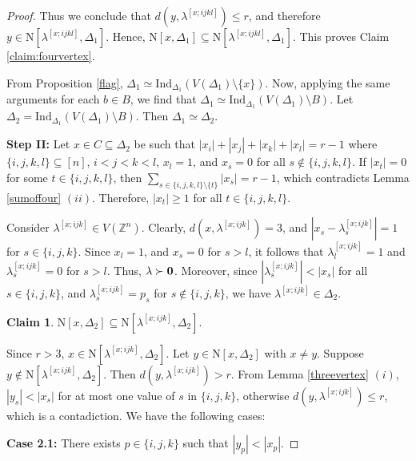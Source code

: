 \documentclass{amsart}
\theoremstyle{definition}
\newtheorem{claim}[theorem]{Claim}
\theoremstyle{remark}
\numberwithin{equation}{section}
\newcommand{\D}{\Delta}
\def\Z{{\mathbb{Z}}}
\def\n{{\mathrm{N}}}
\begin{document}
\begin{proof}
	Thus we conclude that $d(y, \lambda^{[x;ijkl]}) \leq r$, and therefore $y \in \n[\lambda^{[x;ijkl]}, \D_1]$.  Hence, $\n[x,\D_1]\subseteq \n[\lambda^{[x;ijkl]},\D_1]$. This proves Claim \ref{claim:fourvertex}.  
	
	
	From Proposition \ref{flag}, $\D_1\simeq \mathrm{Ind}_{\D_1}(V(\D_1)\setminus \{x\})$. Now, applying the same arguments for each $b\in B$, we find that $\D_1\simeq \mathrm{Ind}_{\D_1}(V(\D_1)\setminus B)$. 
	Let $\D_2=\mathrm{Ind}_{\D_1}(V(\D_1)\setminus B)$. Then $\D_1\simeq \D_2$.
	
	
	
    \smallskip
	\noindent \textbf{Step II:}
	Let $x\in C\subseteq \D_2$ be such that $|x_i|+|x_j|+|x_k|+|x_l|=r-1$  where $\{i,j,k,l\}\subseteq [n]$, $i<j<k<l$, $x_l=1$, and $x_s=0$ for all $s\notin \{i,j,k,l\}$. If $|x_t|=0$ for some $t\in \{i,j,k,l\}$, then $\sum_{s\in\{i,j,k,l\}\setminus\{t\}}|x_s|=r-1$, which contradicts Lemma \ref{sumoffour} $(ii)$. Therefore, $|x_t|\geq 1$ for all $t\in \{i,j,k,l\}$.
	
	Consider $\lambda^{[x;ijk]}\in V(\Z^n)$. Clearly, $d(x,\lambda^{[x;ijk]})=3$, and $|x_s-\lambda^{[x;ijk]}_s|=1$ for $s\in\{i,j,k\}$. Since  $x_l=1$, and $x_s=0$ for $s>l$, it follows that $\lambda^{[x;ijk]}_l=1$ and $\lambda^{[x;ijk]}_s=0$ for $s>l$. Thus, $\lambda\succ{\bf{0}}$. Moreover, since $|\lambda^{[x;ijk]}_s|<|x_s|$ for all $s\in\{i,j,k\}$, and $\lambda^{[x;ijk]}_s=p_s$ for $s\notin\{i,j,k\}$, we have $\lambda^{[x;ijk]}\in\D_2$.
    
	\vspace{-0.5 cm}
    
	\begin{claim}\label{claim:fourvertex2}
		$\n[x, \D_2] \subseteq \n[\lambda^{[x;ijk]}, \D_2]$.
	\end{claim}
    
    \vspace{-0.5 cm}
    
	Since $r > 3$, $x\in\n[\lambda^{[x;ijk]}, \D_2]$. Let $y\in\n[x,\D_2]$ with $x\neq y$. Suppose $y\notin \n[\lambda^{[x;ijk]},\D_2]$. Then $d(y,\lambda^{[x;ijk]})>r$. From Lemma \ref{threevertex} $(i)$, $|y_s|<|x_s|$ for at most one value of $s$ in  $\{i,j,k\}$, otherwise $d(y,\lambda^{[x;ijk]})\leq r$, which is a contadiction. We have the following cases:
	
	
    \smallskip
	\noindent \textbf{Case 2.1:} There exists $p \in \{i, j, k\}$ such that $|y_p| < |x_p|$. 
	

\end{proof}
\end{document}
